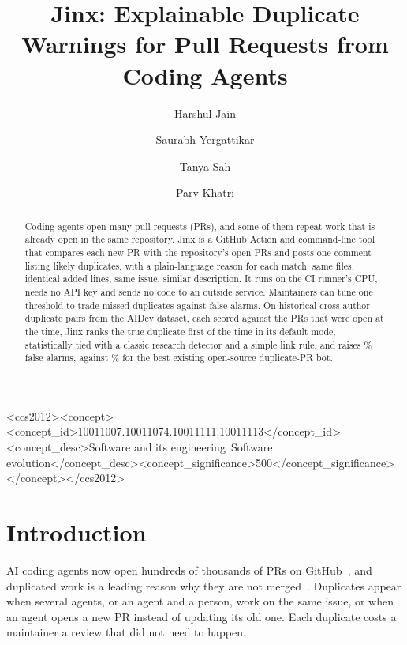 \documentclass[sigconf]{acmart}
\begin{document}
\title{Jinx: Explainable Duplicate Warnings for Pull Requests from Coding Agents}
\author{Harshul Jain}
\author{Saurabh Yergattikar}
\author{Tanya Sah}
\author{Parv Khatri}
\begin{abstract}
Coding agents open many pull requests (PRs), and some of them repeat work that is already open in the same repository. Jinx is a GitHub Action and command-line tool that compares each new PR with the repository's open PRs and posts one comment listing likely duplicates, with a plain-language reason for each match: same files, identical added lines, same issue, similar description. It runs on the CI runner's CPU, needs no API key and sends no code to an outside service. Maintainers can tune one threshold to trade missed duplicates against false alarms. On \nCross{} historical cross-author duplicate pairs from the AIDev dataset, each scored against the PRs that were open at the time, Jinx ranks the true duplicate first \ROnejinxlex{} of the time in its default mode, statistically tied with a classic research detector and a simple link rule, and raises \FARjinxlex\% false alarms, against \FARxcg\% for the best existing open-source duplicate-PR bot.
\end{abstract}
\begin{CCSXML}
<ccs2012><concept><concept_id>10011007.10011074.10011111.10011113</concept_id><concept_desc>Software and its engineering~Software evolution</concept_desc><concept_significance>500</concept_significance></concept></ccs2012>
\end{CCSXML}
\maketitle

\section{Introduction}
AI coding agents now open hundreds of thousands of PRs on GitHub~\cite{li2026aidev}, and duplicated work is a leading reason why they are not merged~\cite{ehsani2026fail,alam2026unmerged}. Duplicates appear when several agents, or an agent and a person, work on the same issue, or when an agent opens a new PR instead of updating its old one. Each duplicate costs a maintainer a review that did not need to happen.
\end{document}

